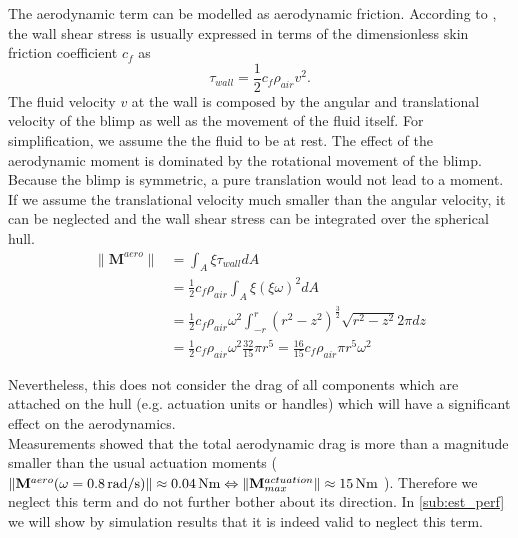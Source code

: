 The aerodynamic term can be modelled as aerodynamic friction.
According to \citet{Kundu2012}, the wall shear stress is usually expressed in terms of the dimensionless skin friction coefficient $c_f$ as 
\begin{equation}
\tau_{wall} = 
\frac{1}{2} c_f \rho_{air} v^2 .
\end{equation}
The fluid velocity $v$ at the wall is composed by the angular and translational velocity of the blimp as well as the movement of the fluid itself.
For simplification, we assume the the fluid to be at rest.
The effect of the aerodynamic moment is dominated by the rotational movement of the blimp.
Because the blimp is symmetric, a pure translation would not lead to a moment.
If we assume the translational velocity much smaller than the angular velocity, it can be neglected and the wall shear stress can be integrated over the spherical hull. 
\begin{equation}
\begin{aligned}
\| \mathbf{M}^{aero} \|
&= \int_A \xi \tau_{wall} dA \\
&= \frac{1}{2} c_f \rho_{air} \int_A \xi (\xi \omega)^2 dA \\
&= \frac{1}{2} c_f \rho_{air} \omega^2 \int_{-r}^{r} (r^2-z^2)^{\frac{3}{2}} \sqrt{r^2-z^2} 2\pi dz \\
&= \frac{1}{2} c_f \rho_{air} \omega^2 \frac{32}{15} \pi r^5
 = \frac{16}{15} c_f \rho_{air} \pi r^5 \omega^2
\end{aligned}
\end{equation}

Nevertheless, this does not consider the drag of all components which are attached on the hull (e.g. actuation units or handles) which will have a significant effect on the aerodynamics.
\\

Measurements showed that the total aerodynamic drag is more than a magnitude smaller than the usual actuation moments (
$\|\mathbf{M}^{aero}(\omega = \unit[0.8]{rad/s})\| \approx \unit[0.04]{Nm} \Leftrightarrow 
\| \mathbf{M}^{actuation}_{max} \| \approx \unit[15]{Nm}$
). 
Therefore we neglect this term and do not further bother about its direction.
In \cref{sub:est_perf} we will show by simulation results that it is indeed valid to neglect this term.

%
%

